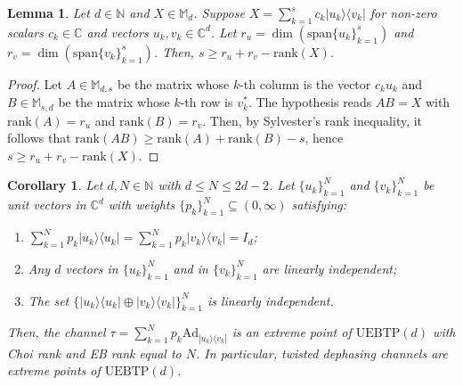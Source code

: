 \documentclass[11pt,reqno]{amsart}
\theoremstyle{definition}
\theoremstyle{plain}
\newtheorem{lem}[defn]{Lemma}
\newtheorem{cor}[defn]{Corollary}
\theoremstyle{remark}
\newcommand{\la}{\langle}
\newcommand{\ra}{\rangle}
\numberwithin{equation}{section}%
\begin{document}
\begin{lem}\label{EMD:lem10}
	Let $d\in\mathbb{N}$ and $X\in \mathbb{M}_d$. Suppose $X = \sum_{k=1}^s c_k |u_k\ra\la v_k|$ for non-zero scalars $c_k \in \mathbb{C}$ and vectors $u_k, v_k \in \mathbb{C}^d$. Let $r_u = \dim(\text{span}\{u_k\}_{k=1}^s)$ and $r_v = \dim(\text{span}\{v_k\}_{k=1}^s)$. Then, $s \ge r_u + r_v - \text{rank}(X)$.
\end{lem}


\begin{proof}
	Let $A\in \mathbb{M}_{d,s}$ be the matrix whose $k$-th column is the vector $c_ku_k$ and $B\in \mathbb{M}_{s,d}$ be the matrix whose $k$-th row is $v_k^*$.  The hypothesis reads $AB=X$ with $\text{rank}(A)=r_u$ and $\text{rank}(B)=r_v$. Then, by Sylvester's rank inequality, it follows that $\text{rank}(AB)\ge \text{rank}(A)+\text{rank}(B)-s$, hence $s\ge r_u+r_v-\text{rank}(X)$.
\end{proof} 


\begin{cor}\label{EMD:cor3}
	Let $d, N \in \mathbb{N}$ with $d\leq N \le 2d-2$. Let $\{u_k\}_{k=1}^N$ and $\{v_k\}_{k=1}^N$ be unit vectors in $\mathbb{C}^d$ with weights $\{p_k\}_{k=1}^N \subseteq (0,\infty)$ satisfying:
	\begin{enumerate}
		\item $\sum_{k=1}^N p_k|u_k\ra\la u_k| = \sum_{k=1}^N p_k|v_k\ra\la v_k| = I_d$;
		\item Any $d$ vectors in $\{u_k\}_{k=1}^N$ and in $\{v_k\}_{k=1}^N$ are linearly independent;
		\item The set $\{|u_k\ra\la u_k| \oplus |v_k\ra\la v_k|\}_{k=1}^N$ is linearly independent.
	\end{enumerate}
	Then, the channel $\tau = \sum_{k=1}^N p_k\text{Ad}_{|u_k\ra\la v_k|}$ is an extreme point of $\mathrm{UEBTP}(d)$ with Choi rank and EB rank equal to $N$. In particular, twisted dephasing channels are extreme points of $\mathrm{UEBTP}(d)$.
\end{cor}
\end{document}
